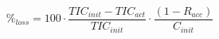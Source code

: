 \documentclass[authoryear,preprint,review,12pt]{elsarticle}
\begin{document}
                                                                                                                                                                                                                                                                                                                                                                                                                                                                                                                                                                                                                                                                                                                                                                                                                                                                                                                                                                                                                                                                                                                              \begin{equation}
                                                                                                                                                                                                                                                                                                                                                                                                                                                                                                                                                                                                                                                                                                                                                                                                                                                                                                                                                                                                                                                                                                                              \%_{loss} = 100\cdot\frac{TIC_{init}-TIC_{act}}{TIC_{init}}\cdot\frac{\left ( 1-R_{acc}\right ) }{C_{init}}

\end{equation}
\end{document}
